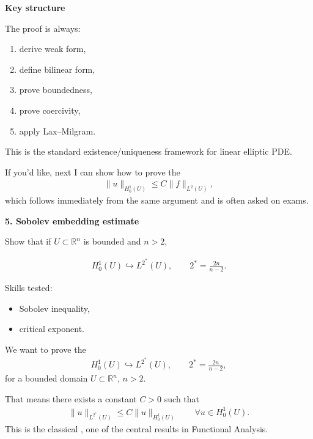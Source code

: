 \documentclass[12pt,a4paper]{report}
\begin{document}
\begin{description}
\begin{description}
\item \textbf{Key structure}

The proof is always:

\begin{enumerate}
\item derive weak form,
\item define bilinear form,
\item prove boundedness,
\item prove coercivity,
\item apply Lax–Milgram.
\end{enumerate}

This is the standard existence/uniqueness framework for linear elliptic PDE.

\end{description}

If you'd like, next I can show how to prove the 
\begin{align*}
\|u\|_{H_0^1(U)}\le C\|f\|_{L^2(U)},
\end{align*}
which follows immediately from the same argument and is often asked on exams.


\newpage\item \textbf{5. Sobolev embedding estimate}

Show that if $U\subset\mathbb R^n$ is bounded and $n>2$,

\begin{align*}
H_0^1(U)\hookrightarrow L^{2^*}(U),
\qquad 2^*=\frac{2n}{n-2}.
\end{align*}

Skills tested:

	\begin{itemize}
    \item Sobolev inequality,
    \item critical exponent.
	\end{itemize}

\HLINE


We want to prove the 
\begin{align*}
H_0^1(U)\hookrightarrow L^{2^*}(U),
\qquad 2^*=\frac{2n}{n-2},
\end{align*}
for a bounded domain $U\subset\mathbb R^n$, $n>2$.

That means there exists a constant $C>0$ such that
\begin{align*}
\|u\|_{L^{2^*}(U)} \le C\|u\|_{H_0^1(U)} \qquad\forall u\in H_0^1(U).
\end{align*}
This is the classical , one of the central results in Functional Analysis.


\end{description}
\end{document}
